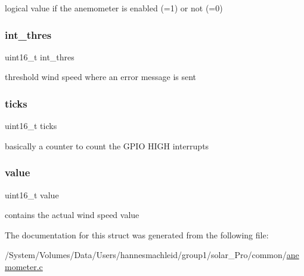 logical value if the anemometer is enabled (=1) or not (=0) \mbox{\label{structanemometer__sensors__t_aa9e9c93852b6dee7a02768af61ec4848}} 
\subsubsection{\texorpdfstring{int\_thres}{int\_thres}}
{\footnotesize\ttfamily uint16\+\_\+t int\+\_\+thres}

threshold wind speed where an error message is sent \mbox{\label{structanemometer__sensors__t_a633f87461ad14b25bca192cdf65d1604}} 
\subsubsection{\texorpdfstring{ticks}{ticks}}
{\footnotesize\ttfamily uint16\+\_\+t ticks}

basically a counter to count the G\+P\+IO H\+I\+GH interrupts \mbox{\label{structanemometer__sensors__t_a900b69af7d674b8db3bceae754b4955a}} 
\subsubsection{\texorpdfstring{value}{value}}
{\footnotesize\ttfamily uint16\+\_\+t value}

contains the actual wind speed value 

The documentation for this struct was generated from the following file\+:\begin{DoxyCompactItemize}
\item 
/\+System/\+Volumes/\+Data/\+Users/hannesmachleid/group1/solar\+\_\+\+Pro/common/\mbox{\hyperlink{anemometer_8c}{anemometer.\+c}}\end{DoxyCompactItemize}
